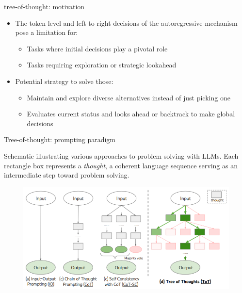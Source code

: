 
\begin{vbframe}{tree-of-thought: motivation}

\vfill

\begin{itemize}
\item The token-level and left-to-right decisions of the autoregressive mechanism pose a limitation for:
    \begin{itemize}
    \item Tasks where initial decisions play a pivotal role
    \item Tasks requiring exploration or strategic lookahead
    \end{itemize}
\item Potential strategy to solve those:
    \begin{itemize}
    \item Maintain and explore diverse alternatives instead of just picking one
    \item Evaluates current status and looks ahead or backtrack to make global decisions
    \end{itemize}

\end{itemize}

\vfill

\end{vbframe}


\begin{vbframe}{Tree-of-thought: prompting paradigm}

\vfill

Schematic illustrating various approaches to problem solving with LLMs. Each rectangle box represents a \textit{thought}, a coherent language sequence serving as an intermediate step toward problem solving.

\begin{figure}
    \centering
    \includegraphics{figure/tot_vs_cot.png}\\
\end{figure}

\vfill

\end{vbframe}

